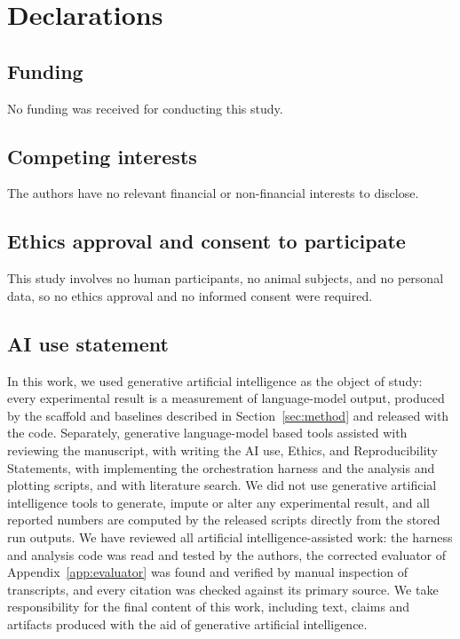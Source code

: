 \documentclass{article}
\begin{document}
\section*{Declarations}

\subsection*{Funding}

No funding was received for conducting this study.

\subsection*{Competing interests}

The authors have no relevant financial or non-financial interests to disclose.

\subsection*{Ethics approval and consent to participate}

This study involves no human participants, no animal subjects, and no
personal data, so no ethics approval and no informed consent were required.

\subsection*{AI use statement}

In this work, we used generative artificial intelligence as the object of study: every experimental result is a
measurement of language-model output, produced by the scaffold and baselines described in
Section~\ref{sec:method} and released with the code. Separately, generative language-model based tools assisted
with reviewing the manuscript, with writing the AI use, Ethics, and Reproducibility Statements, with implementing the orchestration harness and the
analysis and plotting scripts, and with literature search. We did not use generative artificial intelligence tools to
generate, impute or alter any experimental result, and all reported numbers are computed by the
released scripts directly from the stored run outputs. We have reviewed all artificial intelligence-assisted work: the
harness and analysis code was read and tested by the authors, the corrected evaluator of
Appendix~\ref{app:evaluator} was found and verified by manual inspection of transcripts, and every
citation was checked against its primary source. We take responsibility for the final content of
this work, including text, claims and artifacts produced with the aid of generative artificial intelligence.
\end{document}
